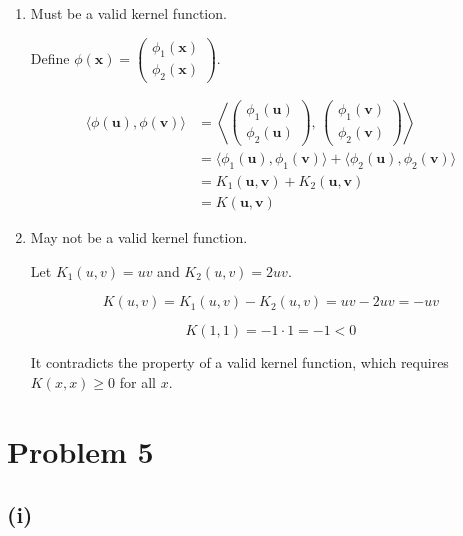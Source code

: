 \documentclass[11pt]{article}
\begin{document}
\begin{enumerate}
    \item[1. ] Must be a valid kernel function.
    
    Define $\phi(\mathbf{x}) = \begin{pmatrix} \phi_1(\mathbf{x}) \\ \phi_2(\mathbf{x}) \end{pmatrix}$.

    $$
    \begin{aligned}
        \langle \phi(\mathbf{u}), \phi(\mathbf{v}) \rangle 
        &= \left\langle \begin{pmatrix} \phi_1(\mathbf{u}) \\ 
        \phi_2(\mathbf{u}) \end{pmatrix}, \, \begin{pmatrix} \phi_1(\mathbf{v}) \\ \phi_2(\mathbf{v}) \end{pmatrix} \right\rangle \\
        &= \langle \phi_1(\mathbf{u}), \phi_1(\mathbf{v}) \rangle + \langle \phi_2(\mathbf{u}), \phi_2(\mathbf{v}) \rangle \\
        &= K_1(\mathbf{u}, \mathbf{v}) + K_2(\mathbf{u}, \mathbf{v}) \\
        &= K(\mathbf{u}, \mathbf{v})
    \end{aligned}
    $$

    \item[2. ] May not be a valid kernel function.
    
    Let $K_1(u, v) = u v$ and $K_2(u, v) = 2 u v$.

    $$
    K(u, v) = K_1(u, v) - K_2(u, v) = uv - 2uv = -uv
    $$

    $$
    K(1, 1) = -1 \cdot 1 = -1 < 0
    $$

    It contradicts the property of a valid kernel function, which requires $K(x, x) \ge 0$ for all $x$.
\end{enumerate}

\newpage

\section*{Problem 5}

\subsection*{(i)}
\end{document}
